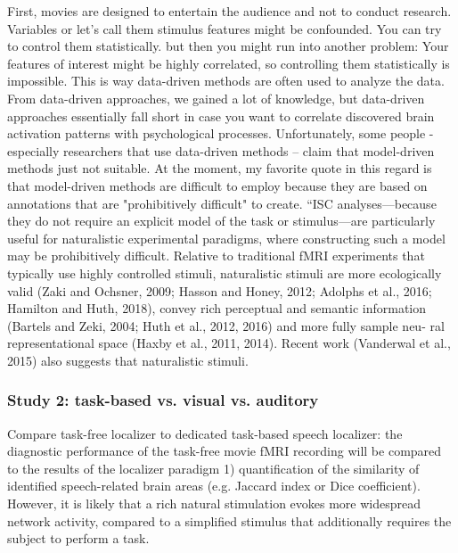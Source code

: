 First, movies are designed to entertain the audience and not to
conduct research.  Variables or let’s call them stimulus features might be
confounded.  You can try to control them statistically. but then you might run
into another problem: Your features of interest might be highly correlated, so
controlling them statistically is impossible.  This is way data-driven methods
are often used to analyze the data.  From data-driven approaches, we gained a
lot of knowledge, but data-driven approaches essentially fall short in case you
want to correlate discovered brain activation patterns with psychological
processes.  Unfortunately, some people - especially researchers that use
data-driven methods – claim that model-driven methods just not suitable.  At the
moment, my favorite quote in this regard is that model-driven methods are
difficult to employ because they are based on annotations that are
"prohibitively difficult" to create.
%
``ISC analyses—because they do not require an explicit model of the task or
stimulus—are particularly useful for naturalistic experimental paradigms, where
constructing such a model may be prohibitively difficult.  Relative to
traditional fMRI experiments that typically use highly controlled stimuli,
naturalistic stimuli are more ecologically valid (Zaki and Ochsner, 2009; Hasson
and Honey, 2012; Adolphs et al., 2016; Hamilton and Huth, 2018), convey rich
perceptual and semantic information (Bartels and Zeki, 2004; Huth et al., 2012,
2016) and more fully sample neu- ral representational space (Haxby et al., 2011,
2014). Recent work (Vanderwal et al., 2015) also suggests that naturalistic
stimuli. \citep{nastase2019measuring}


\subsubsection{Study 2: task-based vs. visual vs. auditory}
%
Compare task-free localizer to dedicated task-based speech localizer:
%
the diagnostic performance of the task-free movie fMRI
recording will be compared to the results of the localizer paradigm
%
1) quantification of the similarity of identified speech-related brain areas
(e.g. Jaccard index or Dice coefficient).
%
However, it is likely that a rich natural stimulation evokes more widespread
network activity, compared to a simplified stimulus that additionally requires
the subject to perform a task.


